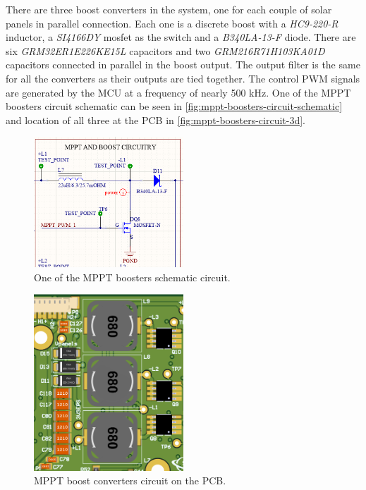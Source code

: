 There are three boost converters in the system, one for each couple of solar panels in parallel connection. Each one is a discrete boost with a \textit{HC9-220-R} inductor, a \textit{SI4166DY} mosfet as the switch and a \textit{B340LA-13-F} diode. There are six \textit{GRM32ER1E226KE15L} capacitors and two \textit{GRM216R71H103KA01D} capacitors connected in parallel in the boost output. The output filter is the same for all the converters as their outputs are tied together. The control PWM signals are generated by the MCU at a frequency of nearly 500 kHz.
One of the MPPT boosters circuit schematic can be seen in \autoref{fig:mppt-boosters-circuit-schematic} and location of all three at the PCB in \autoref{fig:mppt-boosters-circuit-3d}.

\begin{figure}[!ht]
    \begin{center}
        \includegraphics[width=0.5\textwidth]{figures/mppt-boosters-circuit-schematic.png}
        \caption{One of the MPPT boosters schematic circuit.}
        \label{fig:mppt-boosters-circuit-schematic}
    \end{center}
\end{figure}

\begin{figure}[!ht]
    \begin{center}
        \includegraphics[width=0.5\textwidth]{figures/mppt-boosters-circuit-3d.png}
        \caption{MPPT boost converters circuit on the PCB.}
        \label{fig:mppt-boosters-circuit-3d}
    \end{center}
\end{figure}

